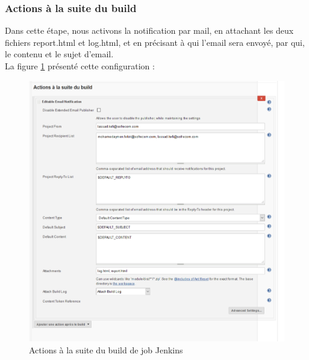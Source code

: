 \subsubsection{Actions à la suite du build}
Dans cette étape, nous activons la notification par mail, en attachant les  deux fichiers report.html et log.html, et en précisant à qui l'email sera envoyé, par qui, le contenu et le sujet d'email.\\La figure \ref{fig:actions-after} présenté cette configuration :
\begin{figure}[H]
	\centering
	\includegraphics[width=1\linewidth]{"img/jenkins/actions after"}
	\caption[Actions à la suite du build de job Jenkins]{Actions à la suite du build de job Jenkins}
	\label{fig:actions-after}
\end{figure}
\newpage
